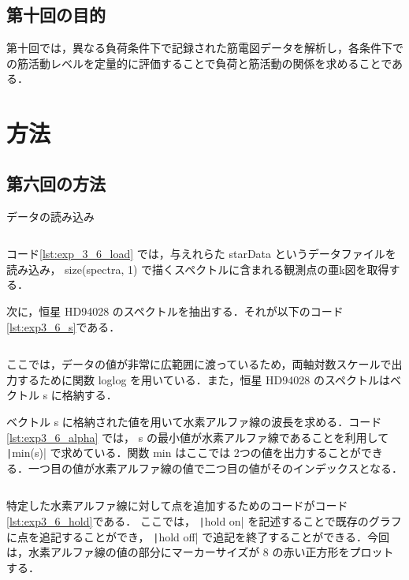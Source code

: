\documentclass[dvipdfmx, titlepage, t]{jsarticle}
\begin{document}
\subsection{第十回の目的}
    第十回では，異なる負荷条件下で記録された筋電図データを解析し，各条件下での筋活動レベルを定量的に評価することで負荷と筋活動の関係を求めることである．

\section{方法}
\subsection{第六回の方法}
    \begin{program}
        \caption{データの読み込み}
        \inputminted[linenos, firstline=1, lastline=2, frame=lines, fontsize=\small]{matlab}{code/Exp3_6_Matlab.m}
        \label{lst:exp_3_6_load}
    \end{program}

    コード\ref{lst:exp_3_6_load} では，与えれらた starData というデータファイルを読み込み， size(spectra, 1) で描くスペクトルに含まれる観測点の亜k図を取得する．

    次に，恒星 HD94028 のスペクトルを抽出する．それが以下のコード \ref{lst:exp3_6_s}である．
    \inputminted[linenos, firstline=14, lastline=19, frame=lines, fontsize=\small]{matlab}{code/Exp3_6_Matlab.m}
    ここでは，データの値が非常に広範囲に渡っているため，両軸対数スケールで出力するために関数 loglog を用いている．また，恒星 HD94028 のスペクトルはベクトル s に格納する．

    ベクトル s に格納された値を用いて水素アルファ線の波長を求める．コード \ref{lst:exp3_6_alpha} では， s の最小値が水素アルファ線であることを利用して \texttt|min(s)| で求めている．関数 min はここでは 2つの値を出力することができる．一つ目の値が水素アルファ線の値で二つ目の値がそのインデックスとなる．

    \inputminted[linenos, firstline=20, lastline=23, frame=lines, fontsize=\small]{matlab}{code/Exp3_6_Matlab.m}

    特定した水素アルファ線に対して点を追加するためのコードがコード\ref{lst:exp3_6_hold}である． ここでは， \texttt|hold on| を記述することで既存のグラフに点を追記することができ， \texttt|hold off| で追記を終了することができる．今回は，水素アルファ線の値の部分にマーカーサイズが 8 の赤い正方形をプロットする．
    \inputminted[linenos, firstline=24, lastline=27, frame=lines, fontsize=\small]{matlab}{code/Exp3_6_Matlab.m}
    
\end{document}
